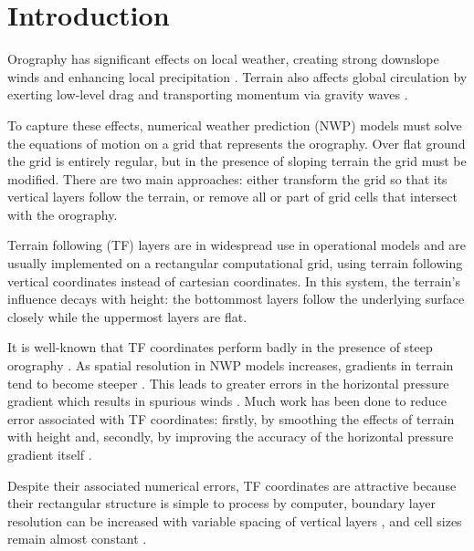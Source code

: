 \chapter{Introduction}

Orography has significant effects on local weather, creating strong downslope winds and enhancing local precipitation \autocite{barry2008}.  Terrain also affects global circulation by exerting low-level drag \autocite{lott-miller1997} and transporting momentum via gravity waves \autocite{mcfarlane1987}.  

To capture these effects, numerical weather prediction (NWP) models must solve the equations of motion on a grid that represents the orography.
Over flat ground the grid is entirely regular, but in the presence of sloping terrain the grid must be modified.  There are two main approaches: either transform the grid so that its vertical layers follow the terrain, or remove all or part of grid cells that intersect with the orography.

Terrain following (TF) layers are in widespread use in operational models and are usually implemented on a rectangular computational grid, using terrain following vertical coordinates instead of cartesian coordinates.  In this system, the terrain's influence decays with height: the bottommost layers follow the underlying surface closely while the uppermost layers are flat.

It is well-known that TF coordinates perform badly in the presence of steep orography \autocite{gary1973}.  As spatial resolution in NWP models increases, gradients in terrain tend to become steeper \autocite{steppeler2002}.  This leads to greater errors in the horizontal pressure gradient which results in spurious winds \autocite{dempsey-davis1998}.  Much work has been done to reduce error associated with TF coordinates: firstly, by smoothing the effects of terrain with height \parencites{simmons-burridge1981}{schaer2002}{leuenberger2010}{klemp2011} and, secondly, by improving the accuracy of the horizontal pressure gradient itself \parencites{mahrer1984}{klemp2011}{zaengl2012}.

Despite their associated numerical errors, TF coordinates are attractive because their rectangular structure is simple to process by computer, boundary layer resolution can be increased with variable spacing of vertical layers \autocite{schaer2002}, and cell sizes remain almost constant \autocite{jebens2011}.

